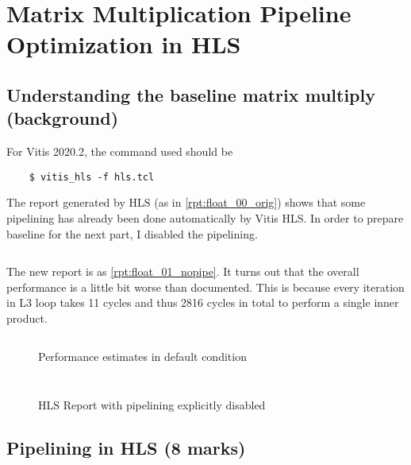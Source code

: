 \section{Matrix Multiplication Pipeline Optimization in HLS}

\subsection{Understanding the baseline matrix multiply (background)}\label{sec:1a}

For Vitis 2020.2, the command used should be
\begin{verbatim}
    $ vitis_hls -f hls.tcl
\end{verbatim}
The report generated by HLS (as in \autoref{rpt:float_00_orig}) shows that
some pipelining has already been done automatically by Vitis HLS.
In order to prepare baseline for the next part, I disabled the pipelining.

\inputminted{diff}{program/float_nopipe.diff}

The new report is as \autoref{rpt:float_01_nopipe}.
It turns out that the overall performance is a little bit worse than documented.
This is because every iteration in L3 loop takes 11 cycles and thus
2816 cycles in total to perform a single inner product.


\begin{figure}
    \inputminted[firstline=25,lastline=48]{text}{report/float_00_orig.rpt}
    \caption{Performance estimates in default condition}
    \label{rpt:float_00_orig}
\end{figure}


\begin{figure}
    {
        \inputminted[firstline=25,lastline=52]{text}{report/float_01_nopipe.rpt}
    }
    {
        \inputminted[firstline=59,lastline=88]{text}{report/float_01_nopipe.rpt}
    }

    \caption{HLS Report with pipelining explicitly disabled}
    \label{rpt:float_01_nopipe}
\end{figure}

\subsection{Pipelining in HLS (8 marks)}

